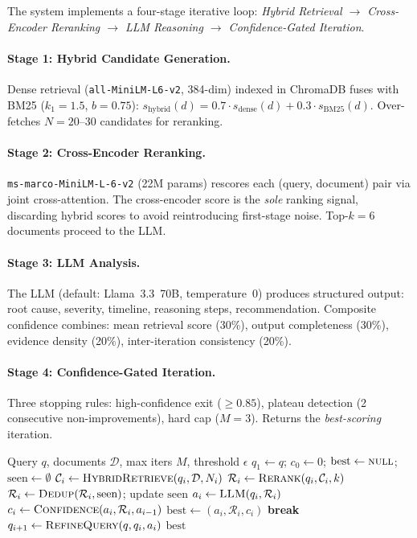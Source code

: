 \documentclass[11pt,a4paper]{article}
\begin{document}
The system implements a four-stage iterative loop:
\emph{Hybrid Retrieval $\to$ Cross-Encoder Reranking $\to$ LLM
Reasoning $\to$ Confidence-Gated Iteration}.

\paragraph{Stage 1: Hybrid Candidate Generation.}
Dense retrieval (\texttt{all-MiniLM-L6-v2}, 384-dim) indexed in
ChromaDB fuses with BM25 ($k_1{=}1.5$, $b{=}0.75$):
$s_{\text{hybrid}}(d) = 0.7 \cdot s_{\text{dense}}(d) + 0.3 \cdot
s_{\text{BM25}}(d)$.
Over-fetches $N{=}20$--$30$ candidates for reranking.

\paragraph{Stage 2: Cross-Encoder Reranking.}
\texttt{ms-marco-MiniLM-L-6-v2} (22M params) rescores each
(query, document) pair via joint cross-attention.
The cross-encoder score is the \emph{sole} ranking signal,
discarding hybrid scores to avoid reintroducing first-stage noise.
Top-$k{=}6$ documents proceed to the LLM.

\paragraph{Stage 3: LLM Analysis.}
The LLM (default: Llama~3.3~70B, temperature~0) produces structured
output: root cause, severity, timeline, reasoning steps,
recommendation.
Composite confidence combines: mean retrieval score (30\%), output
completeness (30\%), evidence density (20\%), inter-iteration
consistency (20\%).

\paragraph{Stage 4: Confidence-Gated Iteration.}
Three stopping rules: high-confidence exit (${\geq}0.85$), plateau
detection (2 consecutive non-improvements), hard cap ($M{=}3$).
Returns the \emph{best-scoring} iteration.

\begin{algorithm}[t]
\caption{Adaptive Iterative RAG}
\label{alg:adaptive}
\begin{algorithmic}[1]
\Require Query $q$, documents $\mathcal{D}$, max iters $M$, threshold $\epsilon$
\State $q_1 \gets q$; $c_0 \gets 0$; $\text{best} \gets \textsc{null}$; $\text{seen} \gets \emptyset$
    \State $\mathcal{C}_i \gets \textsc{HybridRetrieve}(q_i, \mathcal{D}, N_i)$
    \State $\mathcal{R}_i \gets \textsc{Rerank}(q_i, \mathcal{C}_i, k)$
    \State $\mathcal{R}_i \gets \textsc{Dedup}(\mathcal{R}_i, \text{seen})$; update $\text{seen}$
    \State $a_i \gets \textsc{LLM}(q_i, \mathcal{R}_i)$
    \State $c_i \gets \textsc{Confidence}(a_i, \mathcal{R}_i, a_{i-1})$
     $\text{best} \gets (a_i, \mathcal{R}_i, c_i)$ \EndIf
     \textbf{break} \EndIf
    \State $q_{i+1} \gets \textsc{RefineQuery}(q, q_i, a_i)$
\EndFor
\State \Return $\text{best}$
\end{algorithmic}
\end{algorithm}
\end{document}
